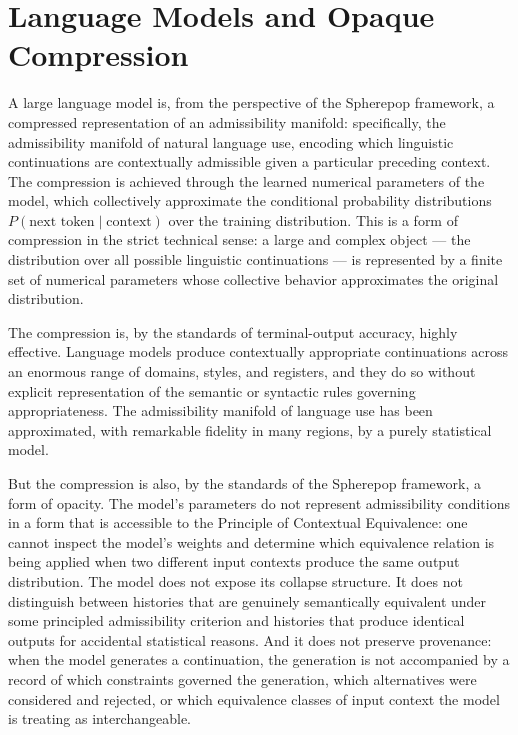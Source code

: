 \documentclass[12pt,openany]{book}
\theoremstyle{plain}
\theoremstyle{definition}
\theoremstyle{remark}
\begin{document}
\section{Language Models and Opaque Compression}

A large language model is, from the perspective of the Spherepop framework, a compressed representation of an admissibility manifold: specifically, the admissibility manifold of natural language use, encoding which linguistic continuations are contextually admissible given a particular preceding context. The compression is achieved through the learned numerical parameters of the model, which collectively approximate the conditional probability distributions $P(\text{next token} \mid \text{context})$ over the training distribution. This is a form of compression in the strict technical sense: a large and complex object — the distribution over all possible linguistic continuations — is represented by a finite set of numerical parameters whose collective behavior approximates the original distribution.

The compression is, by the standards of terminal-output accuracy, highly effective. Language models produce contextually appropriate continuations across an enormous range of domains, styles, and registers, and they do so without explicit representation of the semantic or syntactic rules governing appropriateness. The admissibility manifold of language use has been approximated, with remarkable fidelity in many regions, by a purely statistical model.

But the compression is also, by the standards of the Spherepop framework, a form of opacity. The model's parameters do not represent admissibility conditions in a form that is accessible to the Principle of Contextual Equivalence: one cannot inspect the model's weights and determine which equivalence relation is being applied when two different input contexts produce the same output distribution. The model does not expose its collapse structure. It does not distinguish between histories that are genuinely semantically equivalent under some principled admissibility criterion and histories that produce identical outputs for accidental statistical reasons. And it does not preserve provenance: when the model generates a continuation, the generation is not accompanied by a record of which constraints governed the generation, which alternatives were considered and rejected, or which equivalence classes of input context the model is treating as interchangeable.
\end{document}
